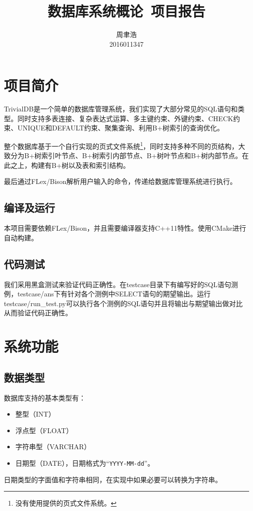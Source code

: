 \documentclass[10pt]{article}
\title{数据库系统概论\ 项目报告}
\author{周聿浩\\ \small{2016011347}}
\begin{document}
\maketitle
\tableofcontents
\clearpage
\section{项目简介}
TrivialDB是一个简单的数据库管理系统，我们实现了大部分常见的SQL语句和类型。同时支持多表连接、复杂表达式运算、多主键约束、外键约束、CHECK约束、UNIQUE和DEFAULT约束、聚集查询、利用B+树索引的查询优化。

整个数据库基于一个自行实现的页式文件系统\footnote{没有使用提供的页式文件系统。}，同时支持多种不同的页结构，大致分为B+树索引叶节点、B+树索引内部节点、B+树叶节点和B+树内部节点。在此之上，构建有B+树以及表和索引结构。

最后通过FLex/Bison解析用户输入的命令，传递给数据库管理系统进行执行。

\subsection{编译及运行}
本项目需要依赖FLex/Bison，并且需要编译器支持C++11特性。使用CMake进行自动构建。

\subsection{代码测试}
我们采用黑盒测试来验证代码正确性。在testcase目录下有编写好的SQL语句测例，testcase/ans下有针对各个测例中SELECT语句的期望输出。运行testcase/run\_test.py可以执行各个测例的SQL语句并且将输出与期望输出做对比从而验证代码正确性。
\section{系统功能}
\subsection{数据类型}
数据库支持的基本类型有：
\begin{itemize}
	\item 整型（INT）
	\item 浮点型（FLOAT）
	\item 字符串型（VARCHAR）
	\item 日期型（DATE），日期格式为``\texttt{YYYY-MM-dd}''。
\end{itemize}
日期类型的字面值和字符串相同，在实现中如果必要可以转换为字符串。
\end{document}
